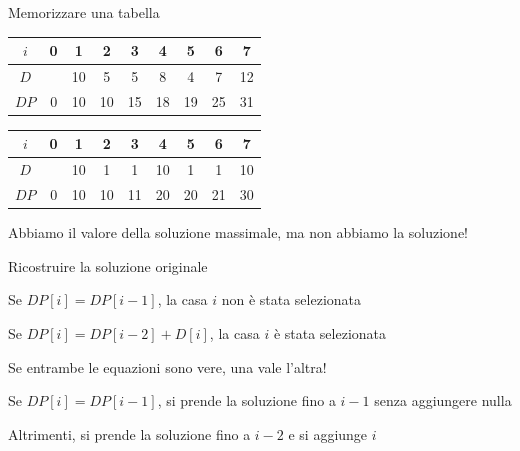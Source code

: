 \begin{frame}{Memorizzare una tabella}

\vspace{-9pt}
\begin{myboxtitle}[Esempi]
\begin{center}
\medskip
\begin{tabular}{|c|c|c|c|c|c|c|c|c|}
\hline
$i$ & 0 & 1 & 2 & 3 & 4 & 5 & 6 & 7 \\\hline
$D$ &   & 10 & 5 & 5 & 8 & 4 & 7 & 12 \\\hline
$\mathit{DP}$ & 0 & 10 & 10 & 15 & 18 & 19 & 25 & 31 \\\hline
\end{tabular}

\medskip
\begin{tabular}{|c|c|c|c|c|c|c|c|c|}
\hline
$i$ & 0 & 1 & 2 & 3 & 4 & 5 & 6 & 7 \\\hline
$D$ &   & 10 & 1 & 1 & 10 & 1 & 1 & 10 \\\hline
$\mathit{DP}$ & 0 & 10 & 10 & 11 & 20 & 20 & 21 & 30 \\\hline
\end{tabular}
\end{center}
\end{myboxtitle}

\begin{myboxtitle}[Problema]
Abbiamo il valore della soluzione massimale, ma non abbiamo
la soluzione!
\end{myboxtitle}

\end{frame}

\begin{frame}[fragile]{Ricostruire la soluzione originale}

\vspace{-9pt}
  \BIL
  \item Se \alert{$\mathit{DP}[i] = \mathit{DP}[i-1]$}, la casa $i$ \alert{non è stata selezionata}
  \item Se \alert{$\mathit{DP}[i] = \mathit{DP}[i-2]+D[i]$}, la casa $i$ \alert{è stata selezionata}
  \item Se entrambe le equazioni sono vere, una vale l'altra!
  \EIL
  
\medskip
{}
  \BIL
  \item Se \alert{$\mathit{DP}[i] = \mathit{DP}[i-1]$}, si prende la soluzione fino a $i-1$ \alert{senza aggiungere nulla}
  \item \alert{Altrimenti}, si prende la soluzione fino a $i-2$ e \alert{si aggiunge $i$}
  \EIL

\end{frame}

